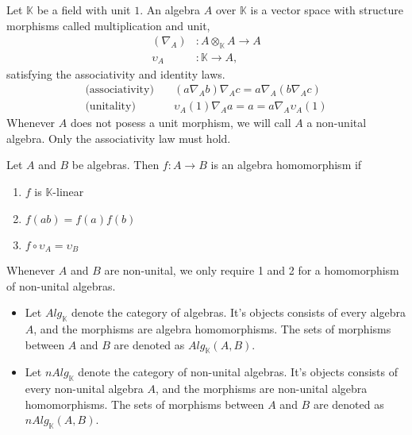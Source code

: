 \documentclass[../thesis.tex]{subfiles}
\begin{document}
            \begin{definition}[Algebra]
                Let $\mathbb{K}$ be a field with unit $1$. An algebra $A$ over $\mathbb{K}$ is a vector space with structure morphisms called multiplication and unit,
                \begin{align*}
                    (\nabla_A) & : A\otimes_{\mathbb{K}}A \rightarrow A \\
                    \upsilon_A & : \mathbb{K} \rightarrow A,
                \end{align*}
                satisfying the associativity and identity laws. 
                \begin{align*}
                    \text{(associativity)}\quad & (a \nabla_A b) \nabla_A c = a \nabla_A (b \nabla_A c) \\
                    \text{(unitality)}\quad & \upsilon_A(1) \nabla_A a = a = a \nabla_A \upsilon_A(1)
                \end{align*}
                Whenever $A$ does not posess a unit morphism, we will call $A$ a non-unital algebra. Only the associativity law must hold.
            \end{definition}

            \begin{definition}
                Let $A$ and $B$ be algebras. Then $f: A\rightarrow B$ is an algebra homomorphism if
                \begin{enumerate}
                    \item $f$ is $\mathbb{K}$-linear
                    \item $f(ab)=f(a)f(b)$
                    \item $f\circ\upsilon_A = \upsilon_B$
                \end{enumerate}
                Whenever $A$ and $B$ are non-unital, we only require 1 and 2 for a homomorphism of non-unital algebras.
            \end{definition}

            \begin{definition}
                \begin{itemize}
                    \item Let $Alg_{\mathbb{K}}$ denote the category of algebras. It's objects consists of every algebra $A$, and the morphisms are algebra homomorphisms. The sets of morphisms between $A$ and $B$ are denoted as $Alg_{\mathbb{K}}(A,B)$.
                    \item Let $nAlg_{\mathbb{K}}$ denote the category of non-unital algebras. It's objects consists of every non-unital algebra $A$, and the morphisms are non-unital algebra homomorphisms. The sets of morphisms between $A$ and $B$ are denoted as $nAlg_{\mathbb{K}}(A,B)$.
                \end{itemize}
            \end{definition}
\end{document}
